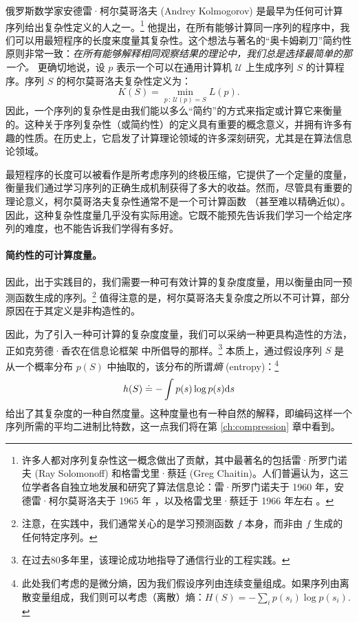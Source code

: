 \documentclass[../../book-main_zh.tex]{subfiles}
\begin{document}
俄罗斯数学家安德雷·柯尔莫哥洛夫 (Andrey Kolmogorov) 是最早为任何可计算序列给出复杂性定义的人之一。\footnote{许多人都对序列复杂性这一概念做出了贡献，其中最著名的包括雷·所罗门诺夫 (Ray Solomonoff) 和格雷戈里·蔡廷 (Greg Chaitin)。人们普遍认为，这三位学者各自独立地发展和研究了算法信息论：雷·所罗门诺夫于 1960 年，安德雷·柯尔莫哥洛夫于 1965 年 \cite{Kolmogorov1998OnTO}，以及格雷戈里·蔡廷于 1966 年左右 \cite{Chaitin-1966}。} 他提出，在所有能够计算同一序列的程序中，我们可以用最短程序的长度来度量其复杂性。这个想法与著名的“奥卡姆剃刀”简约性原则非常一致：{\em 在所有能够解释相同观察结果的理论中，我们总是选择最简单的那一个。} 更确切地说，设 $p$ 表示一个可以在通用计算机 $\mathcal{U}$ 上生成序列 $S$ 的计算程序。序列 $S$ 的柯尔莫哥洛夫复杂性定义为：
\begin{equation}
    K(S) = \min_{p\,:\, \mathcal{U}(p) = S} L(p). 
\end{equation}
因此，一个序列的复杂性是由我们能以多么“简约”的方式来指定或计算它来衡量的。这种关于序列复杂性（或简约性）的定义具有重要的概念意义，并拥有许多有趣的性质。在历史上，它启发了计算理论领域的许多深刻研究，尤其是在算法信息论领域。

最短程序的长度可以被看作是所考虑序列的终极压缩，它提供了一个定量的度量，衡量我们通过学习序列的正确生成机制获得了多大的收益。然而，尽管具有重要的理论意义，柯尔莫哥洛夫复杂性通常不是一个可计算函数 \cite{Cover-Thomas}（甚至难以精确近似）。因此，这种复杂性度量几乎没有实际用途。它既不能预先告诉我们学习一个给定序列的难度，也不能告诉我们学得有多好。






\paragraph{简约性的可计算度量。}

因此，出于实践目的，我们需要一种可有效计算的复杂度度量，用以衡量由同一预测函数生成的序列。\footnote{注意，在实践中，我们通常关心的是学习预测函数 $f$ 本身，而非由 $f$ 生成的任何特定序列。} 值得注意的是，柯尔莫哥洛夫复杂度之所以不可计算，部分原因在于其定义是非构造性的。

因此，为了引入一种可计算的复杂度度量，我们可以采纳一种更具构造性的方法，正如克劳德·香农在信息论框架 \cite{Shannon-1948,Cover-Thomas} 中所倡导的那样。\footnote{在过去80多年里，该理论成功地指导了通信行业的工程实践。} 本质上，通过假设序列 $S$ 是从一个概率分布 $p(S)$ 中抽取的，该分布的所谓{\em 熵} (entropy)：\footnote{此处我们考虑的是微分熵，因为我们假设序列由连续变量组成。如果序列由离散变量组成，我们则可以考虑（离散）熵：$H(S) = - \sum_{i}p(s_i) \log p(s_i).$}
\begin{equation}
    h(S) \doteq -\int p(s) \log p(s) \mathrm{d}s
    \label{eqn:entropy-definition}
\end{equation}
给出了其复杂度的一种自然度量。这种度量也有一种自然的解释，即编码这样一个序列所需的平均二进制比特数，这一点我们将在第 \ref{ch:compression} 章中看到。
\end{document}
